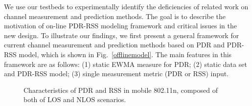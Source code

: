 \documentclass[journal,onecolumn,12pt]{IEEEtran}
\begin{document}
We use our testbeds to experimentally identify the deficiencies of related work on channel measurement and prediction methods. The goal is to describe the motivation of on-line PDR-RSS modeling framework and critical issues in the new design. To illustrate our findings, we first present a general framework for current channel measurement and prediction methods based on PDR and PDR-RSS model, which is shown in Fig.~\ref{offlinemodel}. The main features in this framework are as follows: (1) static EWMA measure for PDR; (2) static data set and PDR-RSS model; (3) single measurement metric (PDR or RSS) input.
\begin{figure}[!t]
\centerline{
}
\caption{Characteristics of PDR and RSS in mobile 802.11n, composed of both of LOS and NLOS scenarios.}
\label{time}
\end{figure}
\end{document}
